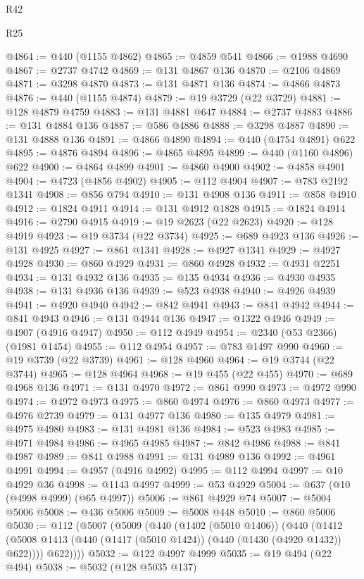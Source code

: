 \begin{lexlean}{R42}
\begin{lexlean}{R25}
\begin{coremodule}
{{{{{{{{{{{{{{{{{{{{{{{{{{{{{{{{{{{{{{{{{{{{{{{{{{{{{{{{{{{{{{{{{{{{{{{{{{{{{{{{{{{{{{{{{{{{{{{{{{{{{{{{{{{{{{{{{{{{{{{{{{{{{{{{{{{{{{{{{{{{{{{{{{{{{{{{{{{{{{{{{{{{{{{{{{{{{{{{{{{{{{{{{{{{{{{{{{{{{{{@4864 := @440 (@1155 @4862)
@4865 := @4859 @541
@4866 := @1988 @4690
@4867 := @2737 @4742
@4869 := @131 @4867 @136
@4870 := @2106 @4869
@4871 := @3298 @4870
@4873 := @131 @4871 @136
@4874 := @4866 @4873
@4876 := @440 (@1155 @4874)
@4879 := @19 @3729 (@22 @3729)
@4881 := @128 @4879 @4759
@4883 := @131 @4881 @647
@4884 := @2737 @4883
@4886 := @131 @4884 @136
@4887 := @586 @4886
@4888 := @3298 @4887
@4890 := @131 @4888 @136
@4891 := @4866 @4890
@4894 := @440 (@4754 @4891) @622
@4895 := @4876 @4894
@4896 := @4865 @4895
@4899 := @440 (@1160 @4896) @622
@4900 := @4864 @4899
@4901 := @4860 @4900
@4902 := @4858 @4901
@4904 := @4723 (@4856 @4902)
@4905 := @112 @4904
@4907 := @783 @2192 @1341
@4908 := @856 @794
@4910 := @131 @4908 @136
@4911 := @858 @4910
@4912 := @1824 @4911
@4914 := @131 @4912 @1828
@4915 := @1824 @4914
@4916 := @2790 @4915
@4919 := @19 @2623 (@22 @2623)
@4920 := @128 @4919
@4923 := @19 @3734 (@22 @3734)
@4925 := @689 @4923 @136
@4926 := @131 @4925
@4927 := @861 @1341
@4928 := @4927 @1341
@4929 := @4927 @4928
@4930 := @860 @4929
@4931 := @860 @4928
@4932 := @4931 @2251
@4934 := @131 @4932 @136
@4935 := @135 @4934
@4936 := @4930 @4935
@4938 := @131 @4936 @136
@4939 := @523 @4938
@4940 := @4926 @4939
@4941 := @4920 @4940
@4942 := @842 @4941
@4943 := @841 @4942
@4944 := @841 @4943
@4946 := @131 @4944 @136
@4947 := @1322 @4946
@4949 := @4907 (@4916 @4947)
@4950 := @112 @4949
@4954 := @2340 (@53 @2366) (@1981 @1454)
@4955 := @112 @4954
@4957 := @783 @1497 @990
@4960 := @19 @3739 (@22 @3739)
@4961 := @128 @4960
@4964 := @19 @3744 (@22 @3744)
@4965 := @128 @4964
@4968 := @19 @455 (@22 @455)
@4970 := @689 @4968 @136
@4971 := @131 @4970
@4972 := @861 @990
@4973 := @4972 @990
@4974 := @4972 @4973
@4975 := @860 @4974
@4976 := @860 @4973
@4977 := @4976 @2739
@4979 := @131 @4977 @136
@4980 := @135 @4979
@4981 := @4975 @4980
@4983 := @131 @4981 @136
@4984 := @523 @4983
@4985 := @4971 @4984
@4986 := @4965 @4985
@4987 := @842 @4986
@4988 := @841 @4987
@4989 := @841 @4988
@4991 := @131 @4989 @136
@4992 := @4961 @4991
@4994 := @4957 (@4916 @4992)
@4995 := @112 @4994
@4997 := @10 @4929 @36
@4998 := @1143 @4997
@4999 := @53 @4929
@5004 := @637 (@10 (@4998 @4999) (@65 @4997))
@5006 := @861 @4929 @74
@5007 := @5004 @5006
@5008 := @436 @5006
@5009 := @5008 @448
@5010 := @860 @5006
@5030 := @112
    (@5007
      (@5009
        (@440
          (@1402 (@5010 @1406))
          (@440
            (@1412 (@5008 @1413 (@440 (@1417 (@5010 @1424)) (@440 (@1430 (@4920 @1432)) @622))))
            @622))))
@5032 := @122 @4997 @4999
@5035 := @19 @494 (@22 @494)
@5038 := @5032 (@128 @5035 @137)
}}}}}}}}}}}}}}}}}}}}}}}}}}}}}}}}}}}}}}}}}}}}}}}}}}}}}}}}}}}}}}}}}}}}}}}}}}}}}}}}}}}}}}}}}}}}}}}}}}}}}}}}}}}}}}}}}}}}}}}}}}}}}}}}}}}}}}}}}}}}}}}}}}}}}}}}}}}}}}}}}}}}}}}}}}}}}}}}}}}}}}}}}}}}}}}}}}}}}}}
\end{coremodule}
\end{lexlean}
\end{lexlean}
